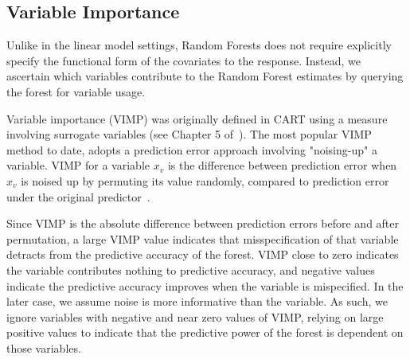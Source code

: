 \documentclass[nojss]{jss}
\begin{document}
\subsection{Variable Importance}\label{S:vimp}
Unlike in the linear model settings, Random Forests does not require explicitly specify the functional form of the covariates to the response. Instead, we ascertain which variables contribute to the Random Forest estimates by querying the forest for variable usage. 

Variable importance (VIMP) was originally defined in CART using a measure involving surrogate variables (see Chapter 5 of~\cite{cart:1984}). The most popular VIMP method to date, adopts a prediction error approach involving "noising-up" a variable. VIMP for a variable $x_v$ is the difference between prediction error when $x_v$ is noised up by permuting its value randomly, compared to prediction error under the original predictor~\citep{Breiman:2001, liaw:2002, Ishwaran:2007, Ishwaran:2008}.

Since VIMP is the absolute difference between prediction errors before and after permutation, a large VIMP value indicates that misspecification of that variable detracts from the predictive accuracy of the forest. VIMP close to zero indicates the variable contributes nothing to predictive accuracy, and negative values indicate the predictive accuracy improves when the variable is mispecified. In the later case, we assume noise is more informative than the variable. As such, we ignore variables with negative and near zero values of VIMP, relying on large positive values to indicate that the predictive power of the forest is dependent on those variables. 
\end{document}
